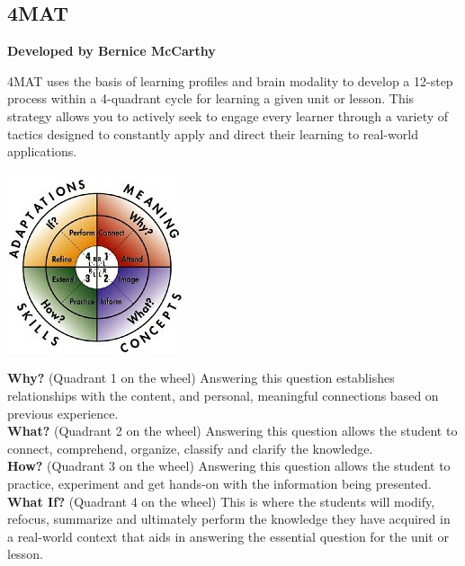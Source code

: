 \newpage
\begin{center}
\section{4MAT}
\textbf{Developed by Bernice McCarthy}\\
\end{center}


4MAT uses the basis of learning profiles and brain modality to develop a 12-step process within a 4-quadrant cycle for learning a given unit or lesson.  This strategy allows you to actively seek to engage every learner through a variety of tactics designed to constantly apply and direct their learning to real-world applications.


\begin{center}
\includegraphics[scale=1]{./img/mat-wheel.jpg} 
\end{center}

\begin{flushleft}
\textbf{Why?} (Quadrant 1 on the wheel)
Answering this question establishes relationships with the content, and personal, meaningful connections based on previous experience.\\

\textbf{What?} (Quadrant 2 on the wheel)
Answering this question allows the student to connect, comprehend, organize, classify and clarify the knowledge.\\

\textbf{How?} (Quadrant 3 on the wheel)
Answering this question allows the student to practice, experiment and get hands-on with the information being presented.\\

\textbf{What If?} (Quadrant 4 on the wheel)
This is where the students will modify, refocus, summarize and ultimately perform the knowledge they have acquired in a real-world context that aids in answering the essential question for the unit or lesson.\\

\end{flushleft}

